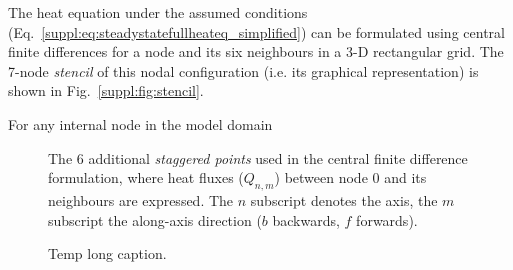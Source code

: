 The heat equation under the assumed conditions (Eq.~\ref{suppl:eq:steadystatefullheateq_simplified}) can be formulated using central finite differences for a node and its six neighbours in a 3-D rectangular grid.
The 7-node \textit{stencil} of this nodal configuration (i.e. its graphical representation) is shown in Fig.~\ref{suppl:fig:stencil}.

For any internal node in the model domain

\begin{figure}[hb]
    \begin{adjustbox}{center}
    \end{adjustbox}
    \caption[Additional (staggered) points used in the central finite difference formulation.]{The 6 additional \textit{staggered points} used in the central finite difference formulation, where heat fluxes ($Q_{n,m}$) between node $0$ and its neighbours are expressed.
    The $n$ subscript denotes the axis, the $m$ subscript the along-axis direction ($b$ backwards, $f$ forwards).}
    \label{suppl:fig:stencil_staggered}
\end{figure}





\begin{figure}[hb]
    \begin{adjustbox}{center}
    \end{adjustbox}
    \caption[Temp short caption.]{Temp long caption.}
    \label{suppl:fig:GridIndexing}
\end{figure}



